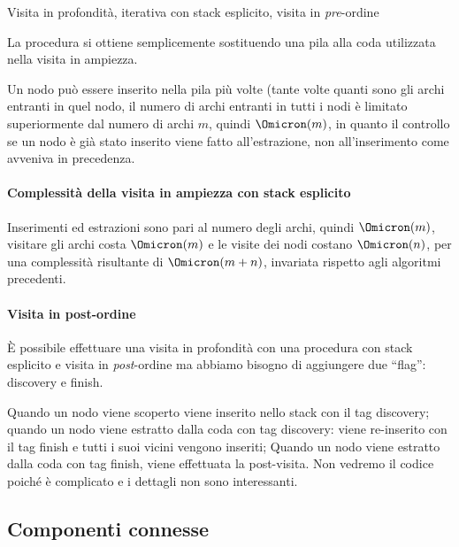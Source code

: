 \begin{algorithm}[H]
	\caption[Visita in profondità iterativa]{Visita in profondità, iterativa con stack esplicito, visita in \emph{pre}-ordine}
	
\end{algorithm}

La procedura si ottiene semplicemente sostituendo una pila alla coda utilizzata nella visita in ampiezza.

Un nodo può essere inserito nella pila più volte (tante volte quanti sono gli archi entranti in quel nodo, il numero di archi entranti in tutti i nodi è limitato superiormente dal numero di archi \(m\), quindi \(\Omicron(m)\), in quanto il controllo se un nodo è già stato inserito viene fatto all'estrazione, non all'inserimento come avveniva in precedenza.

\paragraph{Complessità della visita in ampiezza con stack esplicito}
Inserimenti ed estrazioni sono pari al numero degli archi, quindi \(\Omicron(m)\), visitare gli archi costa \(\Omicron(m)\) e le visite dei nodi costano \(\Omicron(n)\), per una complessità risultante di \(\Omicron(m+n)\), invariata rispetto agli algoritmi precedenti.

\paragraph{Visita in post-ordine}
\`{E} possibile effettuare una visita in profondità con una procedura con stack esplicito e visita in \emph{post}-ordine ma abbiamo bisogno di aggiungere due \enquote{flag}: \textsf{discovery} e \textsf{finish}.

Quando un nodo viene scoperto viene inserito nello stack con il tag \textsf{discovery};
quando un nodo viene estratto dalla coda con tag \textsf{discovery}: viene re-inserito con il tag \textsf{finish} e tutti i suoi vicini vengono inseriti;
Quando un nodo viene estratto dalla coda con tag \textsf{finish}, viene effettuata la post-visita.
Non vedremo il codice poiché è complicato e i dettagli non sono interessanti.


\clearpage
\subsection{Componenti connesse}

